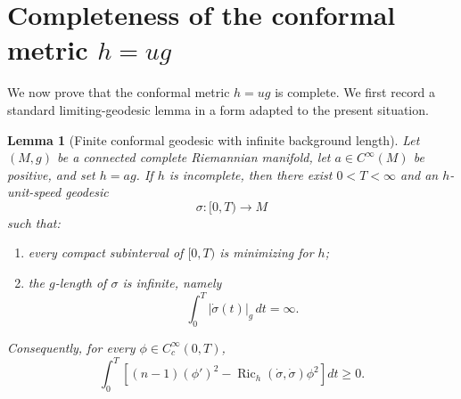\documentclass[11pt]{amsart}
\numberwithin{equation}{section}
\newtheorem{lemma}[theorem]{Lemma}
\DeclareMathOperator{\Ric}{Ric}
\begin{document}
\section{Completeness of the conformal metric \texorpdfstring{$h=ug$}{h=ug}}\label{sec:completeness}

We now prove that the conformal metric $h=ug$ is complete.  We first record a standard limiting-geodesic lemma in a form adapted to the present situation.

\begin{lemma}[Finite conformal geodesic with infinite background length]\label{lem:finite-geodesic}
Let $(M,g)$ be a connected complete Riemannian manifold, let $a\in C^\infty(M)$ be positive, and set $h=a g$.  If $h$ is incomplete, then there exist $0<T<\infty$ and an $h$-unit-speed geodesic
$$
        \sigma:[0,T)\to M
$$
such that:
\begin{enumerate}[label=\textup{(\roman*)}]
\item every compact subinterval of $[0,T)$ is minimizing for $h$;
\item the $g$-length of $\sigma$ is infinite, namely
$$
        \int_0^T |\dot\sigma(t)|_g\,dt=\infty .
$$
\end{enumerate}
Consequently, for every $\phi\in C_c^\infty(0,T)$,
\begin{equation}\label{index-ineq-general}
        \int_0^T\left[(n-1)(\phi')^2-\Ric_h(\dot\sigma,\dot\sigma)\phi^2\right]dt\geq 0 .
\end{equation}
\end{lemma}
\end{document}
